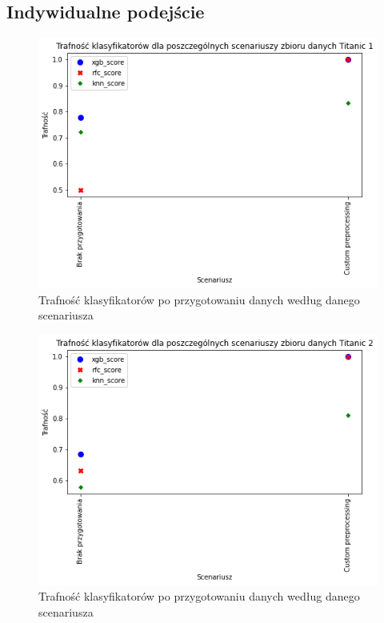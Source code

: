 \documentclass{book}
\begin{document}
\subsection{Indywidualne podejście}

\begin{figure}[H]
\centerline{\includegraphics{Titanic_1_Custom}}
\centering
\caption{Trafność klasyfikatorów po przygotowaniu danych 
według danego scenariusza}
\end{figure}

\begin{figure}[H]
\centerline{\includegraphics{Titanic_2_Custom}}
\centering
\caption{Trafność klasyfikatorów po przygotowaniu danych 
według danego scenariusza}
\end{figure}
\end{document}

